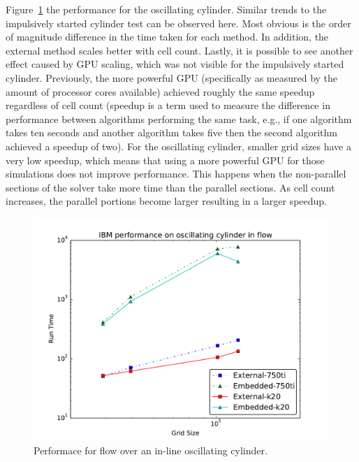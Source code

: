 Figure~\ref{fig:oscperf} the performance for the oscillating cylinder. 
Similar trends to the impulsively started cylinder test can be observed here.
Most obvious is the order of magnitude difference in the time taken for each method. 
In addition, the external method scales better with cell count. 
Lastly, it is possible to see another effect caused by GPU scaling, which was not visible for the impulsively started cylinder. 
Previously, the more powerful GPU (specifically as measured by the amount of processor cores available) achieved roughly the same speedup regardless of cell count (speedup is a term used to measure the difference in performance between algorithms performing the same task, e.g., if one algorithm takes ten seconds and another algorithm takes five then the second algorithm achieved a speedup of two). 
For the oscillating cylinder, smaller grid sizes have a very low speedup, which means that using a more powerful GPU for those simulations does not improve performance. 
This happens when the non-parallel sections of the solver take more time than the parallel sections. 
As cell count increases, the parallel portions become larger resulting in a larger speedup. 
\begin{figure}[!htb]
	\centering
	\includegraphics[width=0.6\linewidth]{osc_performance}
	\caption{Performace for flow over an in-line oscillating cylinder.}
	\label{fig:oscperf}
\end{figure}

